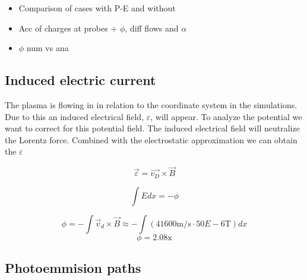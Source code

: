 \begin{itemize}
	\item Comparison of cases with P-E and without
	\item Acc of charges at probes + $\phi$, diff flows and $\alpha$
	\item $\phi$ num vs ana
\end{itemize}

\subsection{Induced electric current}

	The plasma is flowing in in relation to the coordinate system in the simulations.
	Due to this an induced electrical field, \(\varepsilon\), will appear. To analyze the potential we
	want to correct for this potential field. The induced electrical field will
	neutralize the Lorentz force. Combined with the electrostatic approximation
	we can obtain the \(\varepsilon\)

	\begin{equation}
		\vec{\varepsilon} = \vec{v_D}\times \vec{B}
	\end{equation}

	\begin{equation}
		\int{Edx} = -\phi
	\end{equation}

	\begin{equation}
		\phi = -\int \vec{v}_d\times\vec{B} \approx -\int \left( 41600 \text{m/s}\cdot 50E-6 \text{T} \right) dx
	\end{equation}
	\begin{equation}
		\phi = 2.08 \text{x}
	\end{equation}

\subsection{Photoemmision paths}


